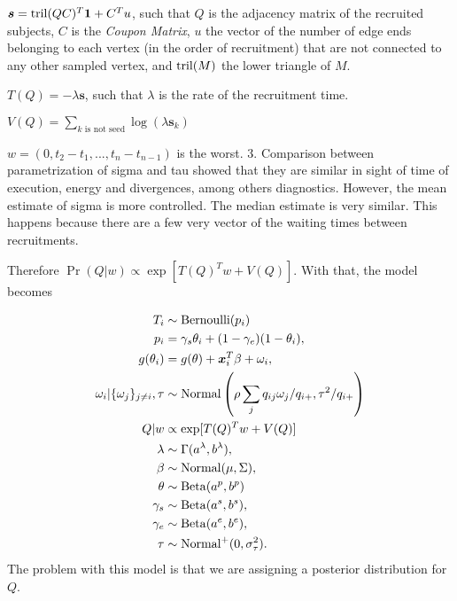 \begin{alineas}
  \item $\boldsymbol{s} = \operatorname{tril}(QC)^T \boldsymbol{1} + C^Tu$, such that $Q$ is the
  adjacency matrix of the recruited subjects, $C$ is the {\em Coupon Matrix},
  $u$ the vector of the number of edge ends belonging to each vertex
  (in the order of recruitment) that are not connected to any other sampled
  vertex, and $\operatorname{tril}(M)$ the lower triangle of $M$. 

  \item $T(Q) = -\lambda \boldsymbol{s}$, such that $\lambda$ is the rate of
  the recruitment time. 

  \item $V(Q) = \sum_{k \text{ is not seed}} \log(\lambda \boldsymbol{s}_k)$
  
  \item $w = (0, t_2 - t_1, ..., t_n - t_{n-1})$ is the worst.
  3. Comparison between parametrization of sigma and tau showed that they are
  similar in sight of time of execution, energy and divergences, among others
  diagnostics. However, the mean estimate of sigma is more controlled. The
  median estimate is very similar. This happens because there are a few very
   vector of the waiting times between
  recruitments.  
\end{alineas}

Therefore $\Pr(Q|w) \propto \exp[T(Q)^Tw + V(Q)]$. With that, the model
becomes 

\begin{equation}
  \begin{aligned}
    T_i &\sim \operatorname{Bernoulli}(p_i) \\
    p_i &= \gamma_s\theta_i + (1-\gamma_e)(1 - \theta_i),  \\
    g(\theta_i) &= g(\theta) + \boldsymbol{x}_i^T\beta + \omega_i,  \\
    \omega_i|\{\omega_j\}_{j\neq i}, \tau &\sim \operatorname{Normal}\left(\rho\sum_j q_{ij}\omega_j/q_{i+}, \tau^2/q_{i+}\right) \\
    Q|w &\propto \exp[T(Q)^Tw + V(Q)] \\
    \lambda &\sim \Gamma(a^{\lambda}, b^{\lambda}), \\ 
    \beta &\sim \operatorname{Normal}(\mu, \Sigma), \\ 
    \theta &\sim \operatorname{Beta}(a^p, b^p) \\
    \gamma_s &\sim \operatorname{Beta}(a^s, b^s), \\
    \gamma_e &\sim \operatorname{Beta}(a^e, b^e), \\  
    \tau &\sim \operatorname{Normal}^+(0,\sigma^2_{\tau}).
  \end{aligned}  
\end{equation}
The problem with this model is that we are assigning a posterior distribution
for $Q$.

